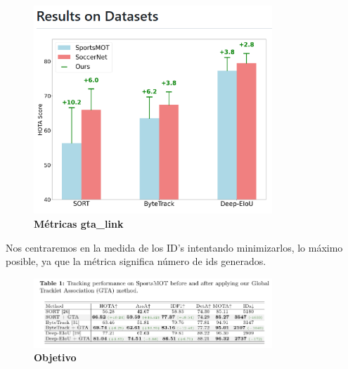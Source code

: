 \documentclass[12pt, a4paper, twoside]{article}
\begin{document}
	\begin{figure}[h]
		\centering
		\includegraphics[width=0.8\textwidth]{image/metricasBeta}
		\caption{\textbf{Métricas gta\_link}}
		\label{fig:metricasBeta}
	\end{figure}
	
	Nos centraremos en la medida de los ID's intentando minimizarlos, lo máximo posible, ya que la métrica significa número de ids generados.
	
	\begin{figure}[h]
		\centering
		\includegraphics[width=0.8\textwidth]{image/Centrarse}
		\caption{\textbf{Objetivo}}
		\label{fig:Centrarse}
	\end{figure}
	
	
	
	
	\printbibliography
	
	
	
	
\end{document}

